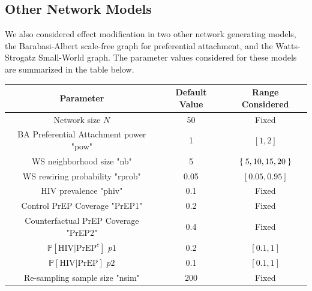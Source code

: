\documentclass{article}
\theoremstyle{definition}
\begin{document}
\subsection{Other Network Models}
We also considered effect modification in two other network generating models, the Barabasi-Albert scale-free graph for preferential attachment, and the Watts-Strogatz Small-World graph. The parameter values considered for these models are summarized in the table below.
\begin{center}
    \begin{tabular}{|c|c|c|}
    \hline
         Parameter & Default Value & Range Considered  \\
         \hline
         Network size $N$& 50 & Fixed \\
         \hline
         BA Preferential Attachment power "pow" & 1 & $\left[1,2 \right]$ \\
         \hline
         WS neighborhood size "nb" & 5 & $\Set{5,10,15,20}$ \\
         \hline
         WS rewiring probability "rprob" & 0.05 &$\left[0.05, 0.95 \right]$ \\
         \hline
         HIV prevalence "phiv" & 0.1 & Fixed\\
         \hline
         Control PrEP Coverage "PrEP1" & 0.2 & Fixed\\
         \hline
         Counterfactual PrEP Coverage "PrEP2" & 0.4 & Fixed\\
         \hline
         $\mathbb{P}\left[\text{HIV} \vert \text{PrEP}^{c}\right]$ $p1$ & 0.2 & $[0.1,1]$\\
         \hline
         $\mathbb{P}\left[\text{HIV} \vert \text{PrEP}\right]$ $p2$ & 0.1 & $[0.1,1]$\\
         \hline
         Re-sampling sample size "nsim" & 200 & Fixed\\
         \hline
    \end{tabular}
\end{center}
\end{document}

